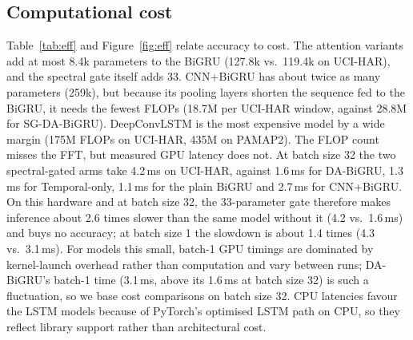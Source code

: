 \documentclass[11pt,a4paper]{article}
\begin{document}
\subsection{Computational cost}
Table~\ref{tab:eff} and Figure~\ref{fig:eff} relate accuracy to cost. The attention variants add at most 8.4k parameters to the BiGRU (127.8k vs.\ 119.4k on UCI-HAR), and the spectral gate itself adds 33. CNN+BiGRU has about twice as many parameters (259k), but because its pooling layers shorten the sequence fed to the BiGRU, it needs the fewest FLOPs (18.7M per UCI-HAR window, against 28.8M for SG-DA-BiGRU). DeepConvLSTM is the most expensive model by a wide margin (175M FLOPs on UCI-HAR, 435M on PAMAP2). The FLOP count misses the FFT, but measured GPU latency does not. At batch size 32 the two spectral-gated arms take 4.2\,ms on UCI-HAR, against 1.6\,ms for DA-BiGRU, 1.3\,ms for Temporal-only, 1.1\,ms for the plain BiGRU and 2.7\,ms for CNN+BiGRU. On this hardware and at batch size 32, the 33-parameter gate therefore makes inference about 2.6 times slower than the same model without it (4.2 vs.\ 1.6\,ms) and buys no accuracy; at batch size 1 the slowdown is about 1.4 times (4.3 vs.\ 3.1\,ms). For models this small, batch-1 GPU timings are dominated by kernel-launch overhead rather than computation and vary between runs; DA-BiGRU's batch-1 time (3.1\,ms, above its 1.6\,ms at batch size 32) is such a fluctuation, so we base cost comparisons on batch size 32. CPU latencies favour the LSTM models because of PyTorch's optimised LSTM path on CPU, so they reflect library support rather than architectural cost.
\end{document}
